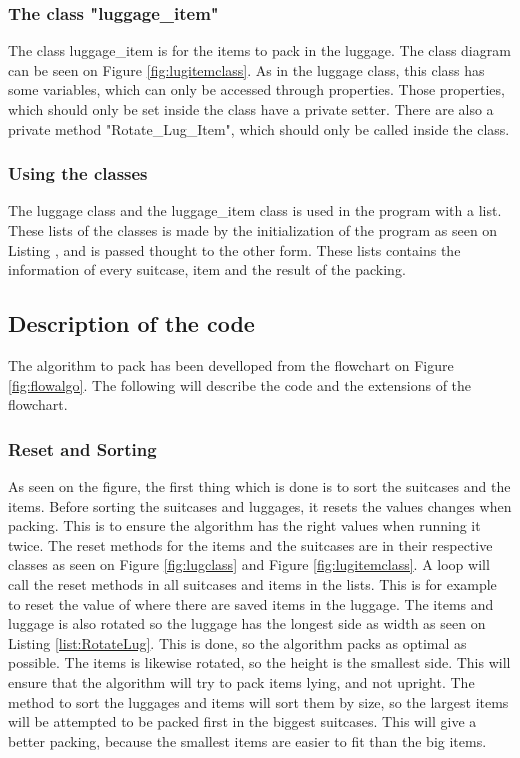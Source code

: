 \subsubsection{The class "luggage\_item"}
The class luggage\_item is for the items to pack in the luggage. The class diagram can be seen on Figure \ref{fig:lugitemclass}. As in the luggage class, this class has some variables, which can only be accessed through properties. Those properties, which should only be set inside the class have a private setter. There are also a private method "Rotate\_Lug\_Item", which should only be called inside the class.
\subsubsection{Using the classes}
The luggage class and the luggage\_item class is used in the program with a list. These lists of the classes is made by the initialization of the program as seen on Listing , and is passed thought to the other form. These lists contains the information of every suitcase, item and the result of the packing.
\subsection{Description of the code}
The algorithm to pack has been develloped from the flowchart on Figure \ref{fig:flowalgo}. The following will describe the code and the extensions of the flowchart.
\subsubsection{Reset and Sorting}
As seen on the figure, the first thing which is done is to sort the suitcases and the items. Before sorting the suitcases and luggages, it resets the values changes when packing. This is to ensure the algorithm has the right values when running it twice. The reset methods for the items and the suitcases are in their respective classes as seen on Figure \ref{fig:lugclass} and Figure \ref{fig:lugitemclass}. A loop will call the reset methods in all suitcases and items in the lists. This is for example to reset the value of where there are saved items in the luggage. The items and luggage is also rotated so the luggage has the longest side as width as seen on Listing \ref{list:RotateLug}. This is done, so the algorithm packs as optimal as possible. The items is likewise rotated, so the height is the smallest side. This will ensure that the algorithm will try to pack items lying, and not upright.
The method to sort the luggages and items will sort them by size, so the largest items will be attempted to be packed first in the biggest suitcases. This will give a better packing, because the smallest items are easier to fit than the big items.
